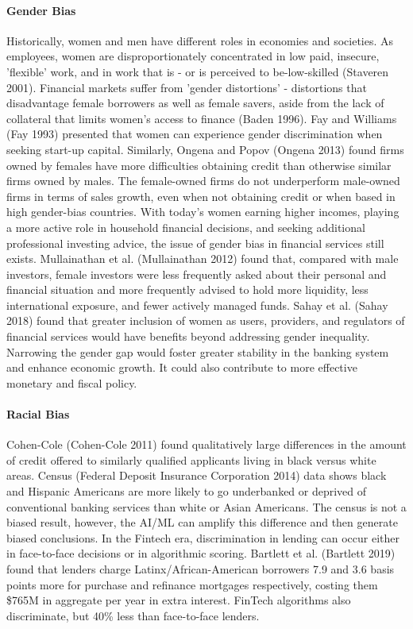 \documentclass{article}
\begin{document}
\paragraph{Gender Bias}
Historically, women and men have different roles in economies and societies. As employees, women are disproportionately concentrated in low paid, insecure, 'flexible' work, and in work that is - or is perceived to be-low-skilled (Staveren 2001).
Financial markets suffer from 'gender distortions' - distortions that disadvantage female borrowers as well as female savers, aside from the lack of collateral that limits women's access to finance (Baden 1996).
Fay and Williams (Fay 1993) presented that women can experience gender discrimination when seeking start-up capital. Similarly, Ongena and Popov (Ongena 2013) found firms owned by females have more difficulties obtaining credit than otherwise similar firms owned by males.  The female-owned firms do not underperform male-owned firms in terms of sales growth, even when not obtaining credit or when based in high gender-bias countries. With today's women earning higher incomes, playing a more active role in household financial decisions, and seeking additional professional investing advice, the issue of gender bias in financial services still exists.  Mullainathan et al. (Mullainathan 2012) found that, compared with male investors, female investors were less frequently asked about their personal and financial situation and more frequently advised to hold more liquidity, less international exposure, and fewer actively managed funds. Sahay et al. (Sahay 2018) found that greater inclusion of women as users, providers, and regulators of financial services would have benefits beyond addressing gender inequality. Narrowing the gender gap would foster greater stability in the banking system and enhance economic growth. It could also contribute to more effective monetary and fiscal policy.


\paragraph{Racial Bias}

Cohen-Cole (Cohen-Cole 2011) found qualitatively large differences in the amount of credit offered to similarly qualified applicants living in black versus white areas. Census (Federal Deposit Insurance Corporation 2014) data shows black and Hispanic Americans are more likely to go underbanked or deprived of conventional banking services than white or Asian Americans.
The census is not a biased result, however, the AI/ML can amplify this difference and then generate biased conclusions.
In the Fintech era, discrimination in lending can occur either in face-to-face decisions or in algorithmic scoring. Bartlett et al. (Bartlett 2019) found that lenders charge Latinx/African-American borrowers 7.9 and 3.6 basis points more for purchase and refinance mortgages respectively, costing them \$765M in aggregate per year in extra interest. FinTech algorithms also discriminate, but 40\% less than face-to-face lenders. 
\end{document}

